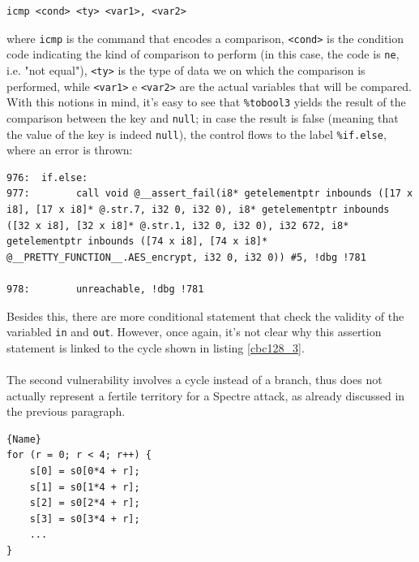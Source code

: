 \documentclass[12pt,a4paper]{book}
\theoremstyle{definition}
\begin{document}
	\begin{lstlisting}[numbers=none, frame=none]
	icmp <cond> <ty> <var1>, <var2> 
	\end{lstlisting}
	
	where \texttt{icmp} is the command that encodes a comparison, \texttt{<cond>} is the condition code indicating the kind of comparison to perform (in this case, the code is \texttt{ne}, i.e. "not equal"), \texttt{<ty>} is the type of data we on which the comparison is performed, while \texttt{<var1>} e \texttt{<var2>} are the actual variables that will be compared. With this notions in mind, it's easy to see that \texttt{\%tobool3} yields the result of the comparison between the key and \texttt{null}; in case the result is false (meaning that the value of the key is indeed \texttt{null}), the control flows to the label \texttt{\%if.else}, where an error is thrown:
	
	\begin{lstlisting}[caption={\texttt{assembly.ll}}, numbers=none]
976:  if.else:
977:  		call void @__assert_fail(i8* getelementptr inbounds ([17 x i8], [17 x i8]* @.str.7, i32 0, i32 0), i8* getelementptr inbounds ([32 x i8], [32 x i8]* @.str.1, i32 0, i32 0), i32 672, i8* getelementptr inbounds ([74 x i8], [74 x i8]* @__PRETTY_FUNCTION__.AES_encrypt, i32 0, i32 0)) #5, !dbg !781

978:  		unreachable, !dbg !781 		
	\end{lstlisting}
	
	Besides this, there are more conditional statement that check the validity of the variabled \texttt{in} and \texttt{out}. However, once again, it's not clear why this assertion statement is linked to the cycle shown in listing \ref{cbc128_3}.
	
	\paragraph{} The second vulnerability involves a cycle instead of a branch, thus does not actually represent a fertile territory for a Spectre attack, as already discussed in the previous paragraph. 

	\begin{minipage}{.5\textwidth}
		\begin{lstlisting}[caption={\texttt{aes\_core.c}}, label=aes-core4, firstnumber=432]{Name}
for (r = 0; r < 4; r++) {
	s[0] = s0[0*4 + r];
	s[1] = s0[1*4 + r];
	s[2] = s0[2*4 + r];
	s[3] = s0[3*4 + r];
	...
}
		\end{lstlisting}
	\end{minipage}
	\vspace{3mm}
\end{document}
